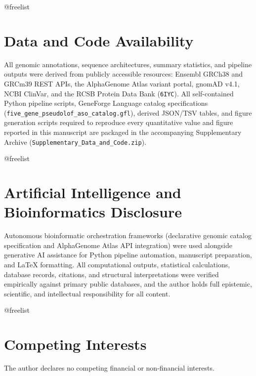 \documentclass[11pt,a4paper]{article}
\makeatletter
\newcommand{\FloatBarrier}{%
  \par
  \expandafter\ifx\csname @freelist\endcsname\relax\else
    \ifx\@deferlist\@empty\else
      \clearpage
    \fi
  \fi
}
\let\orig@section\section
\renewcommand{\section}{\FloatBarrier\orig@section}
\makeatother
\begin{document}
\section*{Data and Code Availability}
All genomic annotations, sequence architectures, summary statistics, and pipeline outputs were derived from publicly accessible resources: Ensembl GRCh38 and GRCm39 REST APIs, the AlphaGenome Atlas variant portal, gnomAD v4.1, NCBI ClinVar, and the RCSB Protein Data Bank (\texttt{6IYC}). All self-contained Python pipeline scripts, GeneForge Language catalog specifications (\texttt{five\_gene\_pseudolof\_aso\_catalog.gfl}), derived JSON/TSV tables, and figure generation scripts required to reproduce every quantitative value and figure reported in this manuscript are packaged in the accompanying Supplementary Archive (\texttt{Supplementary\_Data\_and\_Code.zip}).

\section*{Artificial Intelligence and Bioinformatics Disclosure}
Autonomous bioinformatic orchestration frameworks (declarative genomic catalog specification and AlphaGenome Atlas API integration) were used alongside generative AI assistance for Python pipeline automation, manuscript preparation, and LaTeX formatting. All computational outputs, statistical calculations, database records, citations, and structural interpretations were verified empirically against primary public databases, and the author holds full epistemic, scientific, and intellectual responsibility for all content.

\section*{Competing Interests}
The author declares no competing financial or non-financial interests.



\end{document}
